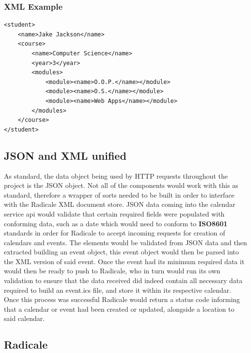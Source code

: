 \subsubsection{XML Example}
\begin{verbatim}
<student>
	<name>Jake Jackson</name>
	<course>
		<name>Computer Science</name>
		<year>3</year>
		<modules>
			<module><name>O.O.P.</name></module>
			<module><name>O.S.</name></module>
			<module><name>Web Apps</name></module>
		</modules>
	</course>
</student>
\end{verbatim}

\subsection{JSON and XML unified}
	As standard, the data object being used by HTTP requests throughout the project is the JSON object. Not all of the components would work with this as standard, therefore a wrapper of sorts needed to be built in order to interface with the Radicale XML document store. JSON data coming into the calendar service api would validate that certain required fields were populated with conforming data, such as a date which would need to conform to \textbf{ISO8601} standards in order for Radicale to accept incoming requests for creation of calendars and events. The elements would be validated from JSON data and then extracted building an event object, this event object would then be parsed into the XML version of said event. Once the event had its minimum required data it would then be ready to push to Radicale, who in turn would run its own validation to ensure that the data received did indeed contain all necessary data required to build an event.ics file, and store it within its respective calendar. Once this process was successful Radicale would return a status code informing that a calendar or event had been created or updated, alongside a location to said calendar. 
    
\subsection{Radicale}
